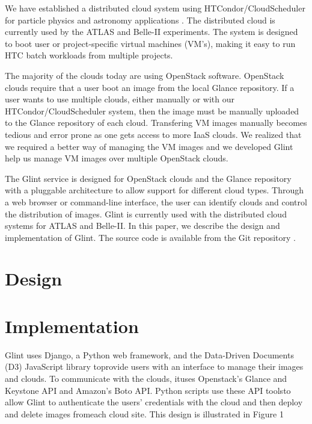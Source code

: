 \documentclass[a4paper]{jpconf}
\begin{document}
We have established a distributed cloud system using HTCondor/CloudScheduler for
particle physics and astronomy applications \cite{hpcs:cloudpaper, sobie-nyc-cloud}.
The distributed cloud is currently used by the ATLAS \cite{ryan-chep} 
and Belle-II \cite{sobie-chep} experiments.
The system is designed to boot user or project-specific virtual machines (VM's),
making it easy to run HTC batch workloads from multiple projects.

The majority of the clouds today are using OpenStack software.
OpenStack clouds require that a user boot an image from the local Glance repository.
If a user wants to use multiple clouds, either manually or with our 
HTCondor/CloudScheduler system, then the image must be manually uploaded 
to the Glance repository of each cloud.
Transfering VM images manually becomes tedious and error prone as one gets access
to more IaaS clouds.
We realized that we required a better way of managing the VM images and we 
developed Glint help us manage VM images over multiple OpenStack clouds.

The Glint service is designed for OpenStack clouds and the Glance repository
with a pluggable architecture to allow support for different cloud types.
Through a web browser or command-line interface, the user can identify clouds 
and control the distribution of images.
Glint is currently used with the distributed cloud systems for ATLAS and Belle-II.
In this paper, we describe the design and implementation of Glint.
The source code is available from the Git repository \cite{glint}.



\section{Design}


\section{Implementation}

Glint uses Django, a Python web framework, and the Data-Driven Documents (D3) 
JavaScript library toprovide users with an interface to manage their images and clouds. 
To communicate with the clouds, ituses Openstack’s Glance and Keystone API and Amazon’s Boto API. 
Python scripts use these API toolsto allow Glint to authenticate the users’ credentials with the 
cloud and then deploy and delete images fromeach cloud site. 
This design is illustrated in Figure 1
\end{document}

